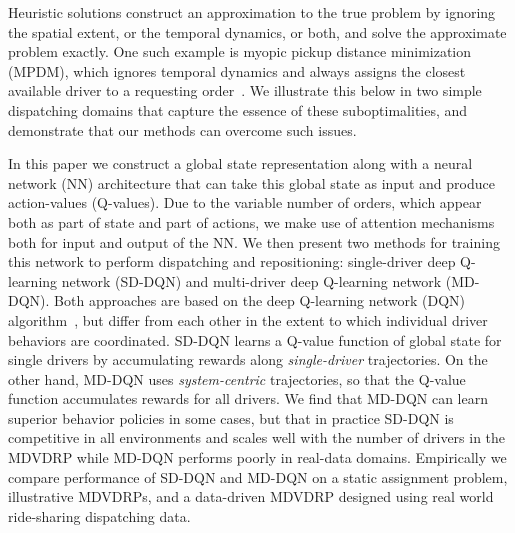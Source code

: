Heuristic solutions construct an approximation to the true problem by ignoring the spatial extent, or the temporal dynamics, or both, and solve the approximate problem exactly. One such example is myopic pickup distance minimization (MPDM), which ignores temporal dynamics and always assigns the closest available driver to a requesting order~\cite{zhang2017taxi}. We illustrate this below in two simple dispatching domains that capture the essence of these suboptimalities, and demonstrate that our methods can overcome such issues.

In this paper we construct a global state representation along with a neural network (NN) architecture that can take this global state as input and produce action-values (Q-values). Due to the variable number of orders, which appear both as part of state and part of actions, we make use of attention mechanisms both for input and output of the NN. We then present two methods for training this network to perform dispatching and repositioning: single-driver deep Q-learning network (SD-DQN) and multi-driver deep Q-learning network (MD-DQN). Both approaches are based on the deep Q-learning network (DQN) algorithm~\cite{mnih2015human}, but differ from each other in the extent to which individual driver behaviors are coordinated. SD-DQN learns a Q-value function of global state for single drivers by accumulating rewards along {\em single-driver} trajectories. On the other hand, MD-DQN uses {\em system-centric} trajectories, so that the Q-value function accumulates rewards for all drivers. We find that MD-DQN can learn superior behavior policies in some cases, but that in practice SD-DQN is competitive in all environments and scales well with the number of drivers in the MDVDRP while MD-DQN performs poorly in real-data domains. Empirically we compare performance of SD-DQN and MD-DQN on a static assignment problem, illustrative MDVDRPs, and a data-driven MDVDRP designed using real world ride-sharing dispatching data.